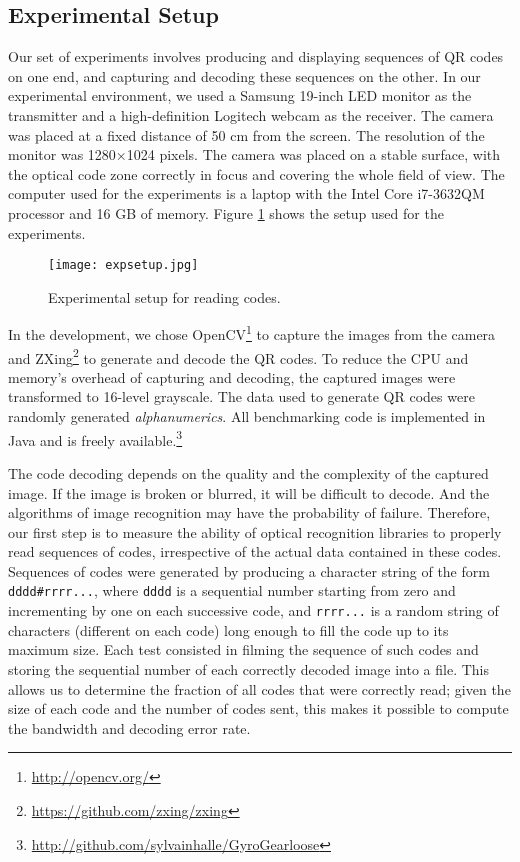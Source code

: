 \subsection{Experimental Setup}

Our set of experiments involves producing and displaying sequences of QR codes on one end, and capturing and decoding these sequences on the other. In our experimental environment, we used a Samsung 19-inch LED monitor as the transmitter and a high-definition Logitech webcam as the receiver. The camera was placed at a fixed distance of 50 cm from the screen. The resolution of the monitor was 1280$\times$1024 pixels. %
The camera was placed on a stable surface, with the optical code zone correctly in focus and covering the whole field of view. The computer used for the experiments is a laptop with the Intel Core i7-3632QM processor and 16 GB of memory. Figure \ref{fig:qr:setup} shows the setup used for the experiments.

\begin{figure}
\centering
\texttt{[image: expsetup.jpg]}
\caption{Experimental setup for reading codes.}
\label{fig:qr:setup}
\end{figure}

In the development, we chose OpenCV\footnote{\url{http://opencv.org/}} to capture the images from the camera and ZXing\footnote{\url{https://github.com/zxing/zxing}} to generate and decode the QR codes. To reduce the CPU and memory's overhead of capturing and decoding, the captured images were transformed to 16-level grayscale. The data used to generate QR codes were randomly generated \emph{alphanumerics}. All benchmarking code is implemented in Java and is freely available.\footnote{\url{http://github.com/sylvainhalle/GyroGearloose}}

The code decoding depends on the quality and the complexity of the captured image. If the image is broken or blurred, it will be difficult to decode. And the algorithms of image recognition may have the probability of failure\citep{adel2006}. Therefore, our first step is to measure the ability of optical recognition libraries to properly read sequences of codes, irrespective of the actual data contained in these codes. Sequences of codes were generated by producing a character string of the form \verb+dddd#rrrr...+, where \verb+dddd+ is a sequential number starting from zero and incrementing by one on each successive code, and \verb+rrrr...+ is a random string of characters (different on each code) long enough to fill the code up to its maximum size. Each test consisted in filming the sequence of such codes and storing the sequential number of each correctly decoded image into a file. This allows us to determine the fraction of all codes that were correctly read; given the size of each code and the number of codes sent, this makes it possible to compute the bandwidth and decoding error rate.

